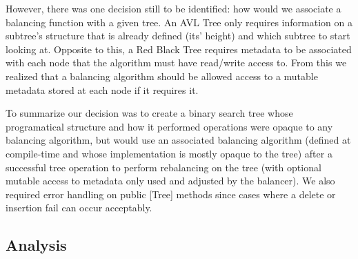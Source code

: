 \documentclass[12pt, letterpaper]{article}
\begin{document}
However, there was one decision still to be identified: how would we associate a balancing function with a given tree.
An AVL Tree only requires information on a subtree's structure that is already defined (its' height) and which subtree to start looking at.
Opposite to this, a Red Black Tree requires metadata to be associated with each node that the algorithm must have read/write access to.
From this we realized that a balancing algorithm should be allowed access to a mutable metadata stored at each node if it requires it.

To summarize our decision was to create a binary search tree whose programatical structure and how it performed operations were opaque
to any balancing algorithm, but would use an associated balancing algorithm (defined at compile-time and whose implementation is mostly opaque to the tree)
after a successful tree operation to perform rebalancing on the tree (with optional mutable access to metadata only used and adjusted by the balancer).
We also required error handling on public [Tree] methods since cases where a delete or insertion fail can occur acceptably.

\subsection{Analysis}
\end{document}

